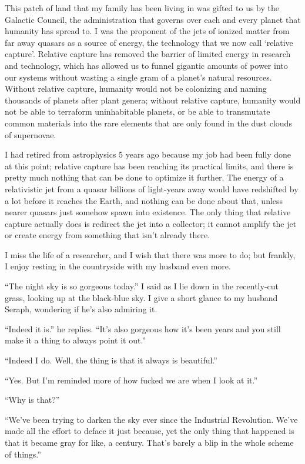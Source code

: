 \documentclass{book}
\begin{document}
			This patch of land that my family has been living in was gifted to us by the Galactic
			Council, the administration that governs over each and every planet that humanity has
			spread to. I was the proponent of the jets of ionized matter from far away quasars as
			a source of energy, the technology that we now call `relative capture'. Relative
			capture has removed the barrier of limited energy in research and technology, which has
			allowed us to funnel gigantic amounts of power into our systems without wasting a single
			gram of a planet's natural resources. Without relative capture, humanity would not be
			colonizing and naming thousands of planets after plant genera; without relative
			capture, humanity would not be able to terraform uninhabitable planets, or be able to
			transmutate common materials into the rare elements that are only found in the dust clouds of
			supernovae.

			I had retired from astrophysics 5 years ago because my job had been fully done at this
			point; relative capture has been reaching its practical limits, and there is pretty
			much nothing that can be done to optimize it further. The energy of a relativistic jet
			from a quasar billions of light-years away would have redshifted by a lot before it
			reaches the Earth, and nothing can be done about that, unless nearer quasars just somehow
			spawn into existence. The only thing that relative capture actually does is redirect the
			jet into a collector; it cannot amplify the jet or create energy from something that
			isn't already there.

			I miss the life of a researcher, and I wish that there was more to do; but frankly, I
			enjoy resting in the countryside with my husband even more.

			``The night sky is so gorgeous today.'' I said as I lie down in the recently-cut grass,
			looking up at the black-blue sky. I give a short glance to my husband Seraph, wondering
			if he's also admiring it.

			``Indeed it is.'' he replies. ``It's also gorgeous how it's been years and you still
			make it a thing to always point it out.''

			``Indeed I do. Well, the thing is that it always is beautiful.''

			``Yes. But I'm reminded more of how fucked we are when I look at it.''

			``Why is that?''

			``We've been trying to darken the sky ever since the Industrial Revolution. We've
			made all the effort to deface it just because, yet the only thing that happened is
			that it became gray for like, a century. That's barely a blip in the whole scheme of
			things.''
\end{document}
